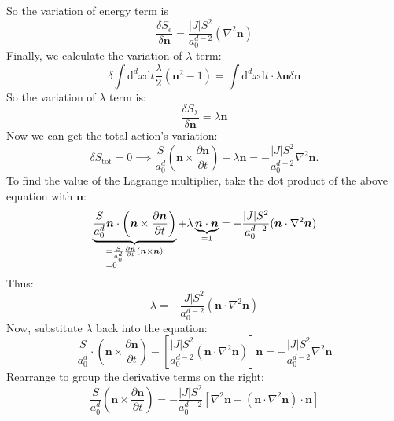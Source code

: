 So the variation of energy term is
\begin{equation}
\frac{\delta S_e}{\delta \bm{n}} = \frac{|J|S^2}{a_0^{d-2}} (\nabla^2 \bm{n})
\end{equation}
Finally, we calculate the variation of $\lambda$ term:
\begin{equation}
\delta \int \mathrm{d}^d x \mathrm{d}t \frac{\lambda}{2}(\bm{n}^2 - 1) = \int \mathrm{d}^d x \mathrm{d}t \cdot \lambda \bm{n} \delta \bm{n}
\end{equation}
So the variation of $\lambda$ term is:
\begin{equation}
\frac{\delta S_\lambda}{\delta \bm{n}} = \lambda \bm{n}
\end{equation}
Now we can get the total action's variation:
\begin{equation}
\delta S_{\mathrm{tot}} = 0 \implies \frac{S}{a_0^d} (\bm{n} \times \frac{\partial \bm{n}}{\partial t}) + \lambda \bm{n} = - \frac{|J|S^2}{a_0^{d-2}} \nabla^2 \bm{n}.
\end{equation}
To find the value of the Lagrange multiplier, take the dot product of the above equation with $\bm{n}$:
\begin{equation}
    \underbrace{ \frac{S}{a_0^d} \bm{n} \cdot \left( \bm{n} \times \frac{\partial \bm{n}}{\partial t} \right) }_{
        \begin{subarray}{l} 
          = \frac{S}{a_0^d} \frac{\partial \bm{n}}{\partial t} (\bm{n} \times \bm{n}) \\ 
          = 0 
        \end{subarray}
      }
      + \lambda \underbrace{ \bm{n} \cdot \bm{n} }_{=1}
      = - \frac{|J| S^2}{a_0^{d-2}} (\bm{n} \cdot \nabla^2 \bm{n})
\end{equation}
Thus:
\begin{equation}
\lambda = - \frac{|J|S^2}{a_0^{d-2}} (\bm{n} \cdot \nabla^2 \bm{n})
\end{equation}
Now, substitute $\lambda$ back into the equation:
\begin{equation}
\frac{S}{a_0^d} \cdot (\bm{n} \times \frac{\partial \bm{n}}{\partial t}) - [\frac{|J|S^2}{a_0^{d-2}} (\bm{n} \cdot \nabla^2 \bm{n})] \bm{n} = - \frac{|J|S^2}{a_0^{d-2}} \nabla^2 \bm{n}
\end{equation}
Rearrange to group the derivative terms on the right:
\begin{equation}
\frac{S}{a_0^d} (\bm{n} \times \frac{\partial \bm{n}}{\partial t}) = - \frac{|J|S^2}{a_0^{d-2}} [\nabla^2 \bm{n} - (\bm{n} \cdot \nabla^2 \bm{n}) \cdot \bm{n}]
\end{equation}
